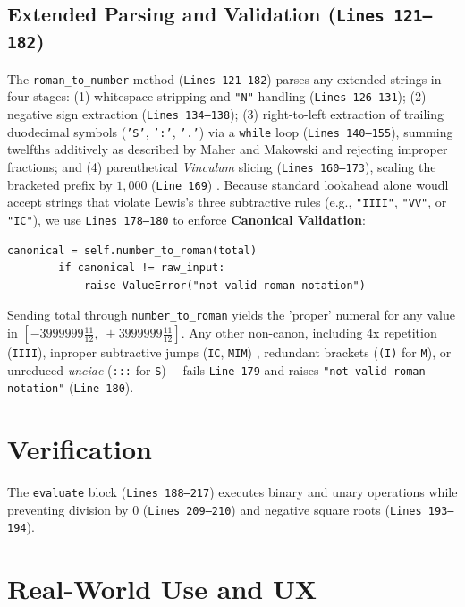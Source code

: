 \documentclass[11pt, a4paper]{article}
\begin{document}

\subsection{Extended Parsing and Validation (\texttt{Lines 121--182})}
The \texttt{roman\_to\_number} method (\texttt{Lines 121--182}) parses any extended strings in four stages: (1) whitespace stripping and \texttt{"N"} handling (\texttt{Lines 126--131}); (2) negative sign extraction (\texttt{Lines 134--138}); (3) right-to-left extraction of trailing duodecimal symbols (\texttt{'S'}, \texttt{':'}, \texttt{'.'}) via a \texttt{while} loop (\texttt{Lines 140--155}), summing twelfths additively as described by Maher and Makowski \cite{maher2001} and rejecting improper fractions; and (4) parenthetical \textit{Vinculum} slicing (\texttt{Lines 160--173}), scaling the bracketed prefix by $1,000$ (\texttt{Line 169}) \cite{lewis2019}.
Because standard lookahead \cite{geeksforgeeks2021} alone woudl accept strings that violate Lewis's \cite{lewis2019} three subtractive rules (e.g., \texttt{"IIII"}, \texttt{"VV"}, or \texttt{"IC"}), we use \texttt{Lines 178--180} to enforce \textbf{Canonical Validation}:

\begin{lstlisting}[style=pythonstyle]
        canonical = self.number_to_roman(total)
        if canonical != raw_input:
            raise ValueError("not valid roman notation")
\end{lstlisting}

Sending total through \texttt{number\_to\_roman} yields the 'proper' numeral for any value in $[-3999999\frac{11}{12},\; +3999999\frac{11}{12}]$. Any other non-canon, including 4x repetition (\texttt{IIII}), inproper subtractive jumps (\texttt{IC}, \texttt{MIM}) \cite{lewis2019}, redundant brackets (\texttt{(I)} for \texttt{M}), or unreduced \textit{unciae} (\texttt{:::} for \texttt{S}) \cite{maher2001}---fails \texttt{Line 179} and raises \texttt{"not valid roman notation"} (\texttt{Line 180}).

\section{Verification}

The \texttt{evaluate} block (\texttt{Lines 188--217}) executes binary and unary operations while preventing division by 0 (\texttt{Lines 209--210}) and negative square roots (\texttt{Lines 193--194}).

\section{Real-World Use and UX}
\end{document}
